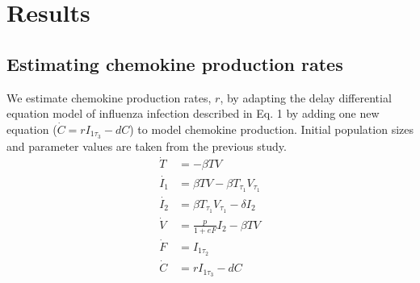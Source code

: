 \documentclass[10pt]{article}
\newcommand{\removed}[1]{{\color{dkred}\sout{#1}}}
\newcommand{\fred}[1]{{\color{dkblue}#1}}
\begin{document}
%



\section{Results}

\subsection{Estimating chemokine production rates}

We estimate chemokine production rates, $r$, by adapting the delay differential equation model of influenza infection described in \cite{Mitchell2011} Eq. 1 by adding one new equation ($\dot{C}=r I_{1 \tau_3}-dC$) to model chemokine production.  Initial population sizes and parameter values are taken from the previous study.
{\footnotesize
\begin{equation}
\begin{aligned}
\dot{T} &= - \beta T V \\
\dot{I_1} &= \beta T V - \beta T_{\tau_1}V_{\tau_1} \\
\dot{I_2} &= \beta T_{\tau_1}V_{\tau_1} - \delta I_2 \\
\dot{V} &= \frac{p}{1+eF} I_2  - \beta T V  \\
\dot{F} &=  I_{1 \tau_2} \\
\dot{C} &= r I_{1 \tau_3} - d C \\
\end{aligned}
\label{eq:dde}
\end{equation}
\vspace{.05in}
}
\end{document}
